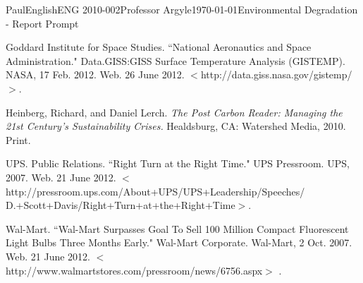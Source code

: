 \documentclass[12pt,letterpaper]{article}
\begin{document}
\begin{mla}{Paul}{English}{ENG 2010-002}{Professor Argyle}{\today}{Environmental Degradation - Report Prompt}
\begin{workscited}

\bibent
Goddard Institute for Space Studies. ``National Aeronautics and Space Administration." Data.GISS:GISS Surface Temperature Analysis (GISTEMP). NASA, 17 Feb. 2012. Web. 26 June 2012. $<$http://data.giss.nasa.gov/gistemp/$>$.

\bibent
Heinberg, Richard, and Daniel Lerch. \textit{The Post Carbon Reader: Managing the 21st Century's Sustainability Crises.} Healdsburg, CA: Watershed Media, 2010. Print.

\bibent
UPS. Public Relations. ``Right Turn at the Right Time." UPS Pressroom. UPS, 2007. Web. 21 June 2012. $<$http://pressroom.ups.com/About+UPS/UPS+Leadership/Speeches/\\D.+Scott+Davis/Right+Turn+at+the+Right+Time$>$.

\pagebreak
\bibent
Wal-Mart. ``Wal-Mart Surpasses Goal To Sell 100 Million Compact Fluorescent Light Bulbs Three Months Early." Wal-Mart Corporate. Wal-Mart, 2 Oct. 2007. Web. 21 June 2012. $<$http://www.walmartstores.com/pressroom/news/6756.aspx$>$ .


\end{workscited}
\end{mla}
\end{document}
